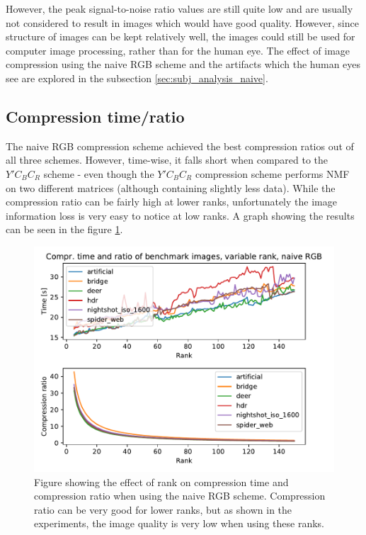 \documentclass[thesis=M,english]{FITthesis}[2012/10/20]
\begin{document}
However, the peak signal-to-noise ratio values are still quite low and are usually
not considered to result in images which would have good quality. However, since
structure of images can be kept relatively well, the images could still be used
for computer image processing, rather than for the human eye. The effect of image
compression using the naive RGB scheme and the artifacts which the human eyes see are
explored in the subsection \ref{sec:subj_analysis_naive}.

\subsection{Compression time/ratio}
The naive RGB compression scheme achieved the best compression ratios out of all three
schemes. However, time-wise, it falls short when compared to the $Y'C_BC_R$ scheme - even though
the $Y'C_BC_R$ compression scheme performs NMF on two different matrices (although containing
slightly less data). While the compression ratio can be fairly high at lower ranks, unfortunately the image
information loss is very easy to notice at low ranks. A graph showing the results can
be seen in the figure \ref{fig:comprtimeratio_naive24}.

\begin{figure}[h]
  \centering
  \includegraphics[scale=0.7]{imgs/results/comprtimeratio_naive24}
  \caption[Compression time and ratio of naive RGB scheme, variable rank]{Figure showing
           the effect of rank on compression time and compression ratio when using
           the naive RGB scheme. Compression ratio can be very good for lower ranks, but as
           shown in the experiments, the image quality is very low when using these ranks.}
  \label{fig:comprtimeratio_naive24}
\end{figure}
\end{document}

